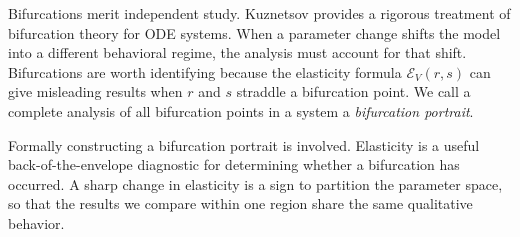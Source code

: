 Bifurcations merit independent study. Kuznetsov \cite{kuznetsov1998elements} provides a rigorous treatment of bifurcation theory for ODE systems.
When a parameter change shifts the model into a different behavioral regime, the analysis must account for that shift.
Bifurcations are worth identifying because the elasticity formula $\mathcal{E}_{V}(r,s)$ can give misleading results when $r$ and $s$ straddle a bifurcation point. We call a complete analysis of all bifurcation points in a system a \textit{bifurcation portrait}.

Formally constructing a bifurcation portrait is involved. Elasticity is a useful back-of-the-envelope diagnostic for determining whether a bifurcation has occurred. A sharp change in elasticity is a sign to partition the parameter space, so that the results we compare within one region share the same qualitative behavior.

